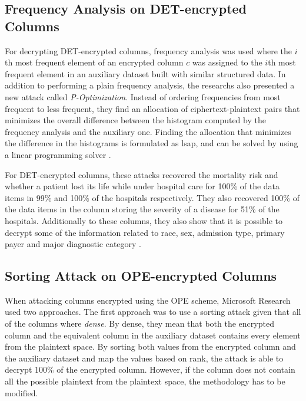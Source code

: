 \subsection{Frequency Analysis on DET-encrypted Columns}

For decrypting DET-encrypted columns, frequency analysis was used where the $i$th most frequent element of an encrypted column $c$ was assigned to the $i$th most frequent element in an auxiliary dataset built with similar structured data. In addition to performing a plain frequency analysis, the researchs also presented a new attack called \emph{P-Optimization}. Instead of ordering frequencies from most frequent to less frequent, they find an allocation of ciphertext-plaintext pairs that minimizes the overall difference between the histogram computed by the frequency analysis and the auxiliary one. Finding the allocation that minimizes the difference in the histograms is formulated as \gls{lsap}, and can be solved by using a linear programming solver \cite{microsoft_cryptdb}.

For DET-encrypted columns, these attacks recovered the mortality risk and whether a patient lost its life while under hospital care for 100\% of the data items in 99\% and 100\% of the hospitals respectively. They also recovered 100\% of the data items in the column storing the severity of a disease for 51\% of the hospitals. Additionally to these columns, they also show that it is possible to decrypt some of the information related to race, sex, admission type, primary payer and major diagnostic category \cite{microsoft_cryptdb}.

\subsection{Sorting Attack on OPE-encrypted Columns}

When attacking columns encrypted using the OPE scheme, Microsoft Research used two approaches. The first approach was to use a sorting attack given that all of the columns where \emph{dense}. By dense, they mean that both the encrypted column and the equivalent column in the auxiliary dataset contains every element from the plaintext space. By sorting both values from the encrypted column and the auxiliary dataset and map the values based on rank, the attack is able to decrypt 100\% of the encrypted column. However, if the column does not contain all the possible plaintext from the plaintext space, the methodology has to be modified.

